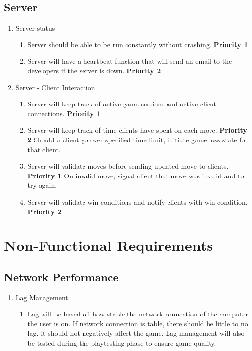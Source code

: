 \documentclass[10pt]{article}
\begin{document}
\subsection{Server}

\begin{enumerate}[resume*]
    \item Server status
    \begin{enumerate}[label*=\arabic*.]
        \item Server should be able to be run constantly without crashing. \textbf{Priority 1}
        \item Server will have a heartbeat function that will send an email to the developers if the server is down. \textbf{Priority 2}
    \end{enumerate}
    \item Server - Client Interaction
    \begin{enumerate}[label*=\arabic*.]
        \item Server will keep track of active game sessions and active client connections. \textbf{Priority 1}
        \item Server will keep track of time clients have spent on each move. \textbf{Priority 2}
            \subitem Should a client go over specified time limit, initiate game loss state for that client.
        \item Server will validate moves before sending updated move to clients. \textbf{Priority 1}
            \subitem On invalid move, signal client that move was invalid and to try again.
        \item Server will validate win conditions and notify clients with win condition. \textbf{Priority 2}
    \end{enumerate}
\end{enumerate}

\section{Non-Functional Requirements}

\subsection{Network Performance}

\begin{enumerate}[label*=N\arabic*.]
    \item Lag Management
	 \begin{enumerate}[label*=\arabic*.]
        \item Lag will be based off how stable the network connection of the computer the user is on. If network connection is table, there should be little to no lag. It should not negatively affect the game. Lag management will also be tested during the playtesting phase to ensure game quality.
	  \end{enumerate}
\end{enumerate}
\end{document}
